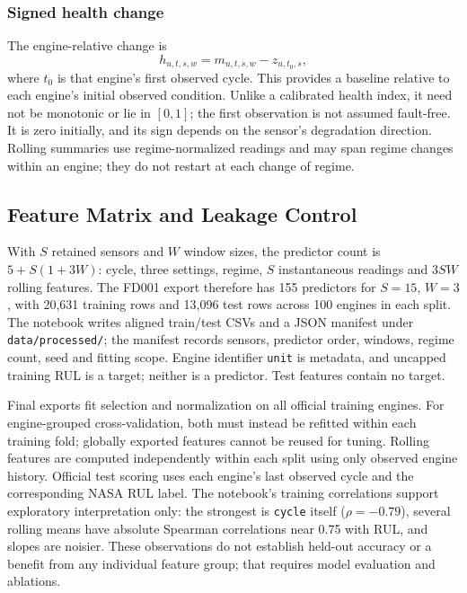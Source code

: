 \subsubsection{Signed health change}
The engine-relative change is
\begin{equation}
    h_{u,t,s,w}=m_{u,t,s,w}-z_{u,t_0,s},
\end{equation}
where $t_0$ is that engine's first observed cycle. This provides a baseline
relative to each engine's initial observed condition. Unlike a calibrated
health index, it need not be monotonic or lie in $[0,1]$; the first observation
is not assumed fault-free. It is zero initially, and its sign depends on the
sensor's degradation direction. Rolling summaries use regime-normalized
readings and may span regime changes within an engine; they do not restart at
each change of regime.

\subsection{Feature Matrix and Leakage Control}
With $S$ retained sensors and $W$ window sizes, the predictor count is
$5+S(1+3W)$: cycle, three settings, regime, $S$ instantaneous readings and
$3SW$ rolling features. The FD001 export therefore has 155 predictors for
$S=15$, $W=3$, with 20,631 training rows and 13,096 test rows across 100 engines
in each split. The notebook writes aligned train/test CSVs and a JSON manifest
under \texttt{data/processed/}; the manifest records sensors, predictor order,
windows, regime count, seed and fitting scope. Engine identifier
\texttt{unit} is metadata, and uncapped training RUL is a target; neither is a
predictor. Test features contain no target.

Final exports fit selection and normalization on all official training engines.
For engine-grouped cross-validation, both must instead be refitted within each
training fold; globally exported features cannot be reused for tuning. Rolling
features are computed independently within each split using only observed
engine history. Official test scoring uses each engine's last observed cycle
and the corresponding NASA RUL label. The notebook's training correlations
support exploratory interpretation only: the strongest is \texttt{cycle}
itself ($\rho=-0.79$), several rolling means have absolute Spearman
correlations near 0.75 with RUL, and slopes are noisier. These
observations do not establish held-out accuracy or a benefit from any individual
feature group; that requires model evaluation and ablations.

